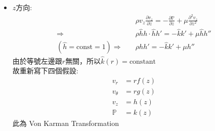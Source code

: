 \documentclass[../main.tex]{subfiles}
\begin{document}
\begin{itemize}
\begin{enumerate}
\begin{itemize}
\begin{align}
        \right) = \mu \left[
          \frac{\partial}{\partial r}\left(
            \frac{1}{r}\frac{\partial }{\partial r}(r v_\theta)
          \right) + \frac{\partial^2 v_\theta}{\partial z^2}
        \right] \nonumber\\
        \Rightarrow \quad & \rho \left(
          \hat ff \cdot g + \hat h h \cdot r g' + \frac{\hat ff \cdot r g}{r}
        \right) = \mu \left[
          \frac{\partial}{\partial r}\left(
            \frac{1}{r}\frac{\partial }{\partial r}(r \cdot rg)
          \right) + r g''
        \right] \nonumber\\
        \Rightarrow \quad & \rho \left(
          \hat f g f + \hat h r h g' + \hat f g f
        \right) = \mu \left[
          \frac{\partial}{\partial r}\left(
            \frac{1}{r}\cdot 2r g
          \right) + r g''
        \right] \nonumber\\
        \Rightarrow \quad & \rho \left(
          2 \hat f g f + \hat h r h g'
        \right) = \cancel{\mu\frac{\partial}{\partial r}(2 g)} +  \mu r g'' \nonumber\\
        \Rightarrow \quad & \rho \left(
          2 \hat f g f + \hat h r h g'
        \right) = \mu rg''
      \end{align}
      由此可知$\hat f(r) = r$，以及$\hat h(r) =\text{constant}$\\
      所以於$v_z$方向運算時，$\frac{\partial v_z}{\partial r} = 0$，就沒有$\hat h$了
      \item $z$方向:
      \begin{align}
        & \rho v_z \frac{\partial v_z}{\partial z} = -\frac{\partial \mathbb{P}}{\partial z} 
        + \mu \frac{\partial^2 v_z}{\partial z^2}\nonumber\\
        \Rightarrow \quad & \rho \hat h h \cdot \hat h h' = -\hat k k' + \mu \hat h h'' \nonumber\\
        (\hat h =\text{const}=1) \Rightarrow \quad & \rho h h' = -\hat k k' + \mu h''
      \end{align}
      由於等號左邊跟$r$無關，所以$\hat k(r) = \text{constant}$\\
      故重新寫下四個假設:
      \begin{align}
        v_r &= r f(z) \\
        v_\theta &= r g(z)\\
        v_z &= h(z)\\
        \mathbb{P} &= k(z)
      \end{align}
      此為 Von Karman Transformation\\

\end{itemize}
\end{enumerate}
\end{itemize}
\end{document}
